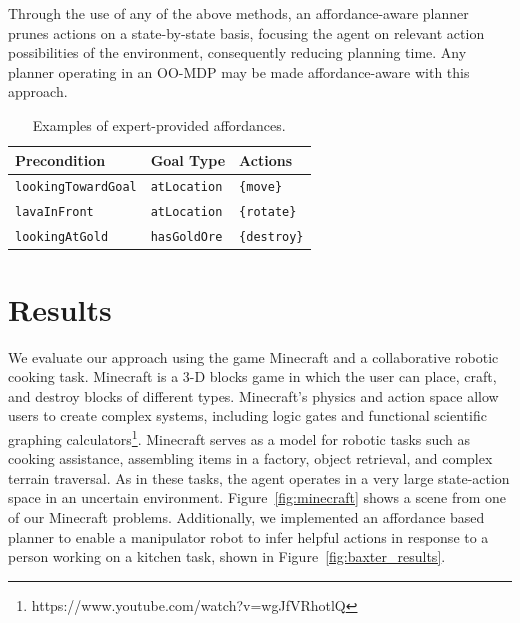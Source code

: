 \documentclass[letterpaper]{article}
\newcommand{\ra}[1]{\renewcommand{\arraystretch}{#1}} %
\begin{document}
Through the use of any of the above methods, an affordance-aware
planner prunes actions on a state-by-state basis, focusing the agent
on relevant action possibilities of the environment, consequently
reducing planning time. Any planner operating in an OO-MDP may be made
affordance-aware with this approach.


\begin{table}[t]
\ra{1.15}
\small
\begin{tabular}{@{}lll}\toprule
Precondition & Goal Type & Actions \\ \midrule
\texttt{lookingTowardGoal} & \texttt{atLocation} & \texttt{\{move\}} \\
\texttt{lavaInFront} & \texttt{atLocation} & \texttt{\{rotate\}} \\
\texttt{lookingAtGold} & \texttt{hasGoldOre} & \texttt{\{destroy\}} \\
\bottomrule
\end{tabular}

\caption{Examples of expert-provided affordances.\label{table:afford_kb_exp}}
\end{table}



\section{Results}
\label{sec:results}


We evaluate our approach using the game Minecraft and a collaborative
robotic cooking task.  Minecraft is a 3-D blocks game in which the
user can place, craft, and destroy blocks of different types.
Minecraft's physics and action space allow users to create complex
systems, including logic gates and functional scientific graphing
calculators\footnote{https://www.youtube.com/watch?v=wgJfVRhotlQ}.
Minecraft serves as a model for robotic tasks such as cooking
assistance, assembling items in a factory, object retrieval, and
complex terrain traversal.  As in these tasks, the agent operates in a
very large state-action space in an uncertain environment.
Figure~\ref{fig:minecraft} shows a scene from one of our Minecraft
problems.  Additionally, we implemented an affordance based planner to
enable a manipulator robot to infer helpful actions in response to a
person working on a kitchen task, shown in Figure~\ref{fig:baxter_results}.
\end{document}
